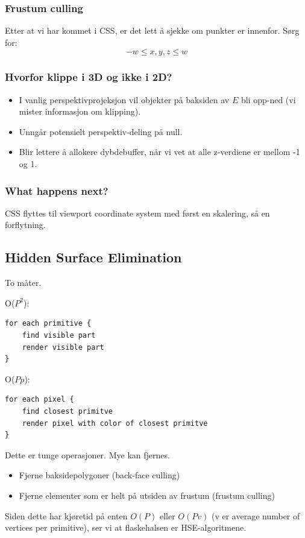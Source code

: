 \subsubsection{Frustum culling}
Etter at vi har kommet i CSS, er det lett å sjekke om punkter er innenfor. Sørg for:
\begin{equation} \label{eq:frustum_culling}
    -w \le x, y, z \le w
\end{equation}

\subsubsection{Hvorfor klippe i 3D og ikke i 2D?}
\begin{itemize}
    \item I vanlig perspektivprojeksjon vil objekter på baksiden av $E$ bli opp-ned (vi mister informasjon om klipping).
    \item Unngår potensielt perspektiv-deling på null.
    \item Blir lettere å allokere dybdebuffer, når vi vet at alle z-verdiene er mellom -1 og 1.
\end{itemize}

\subsubsection{What happens next?}
CSS flyttes til viewport coordinate system med først en skalering, så en forflytning.



\subsection{Hidden Surface Elimination}
To måter.

O($P^2$):
\begin{lstlisting}
for each primitive {
    find visible part
    render visible part
}
\end{lstlisting}

O($Pp$):
\begin{lstlisting}
for each pixel {
    find closest primitve
    render pixel with color of closest primitve
}
\end{lstlisting}
Dette er tunge operasjoner. Mye kan fjernes.
\begin{itemize}
    \item Fjerne baksidepolygoner (back-face culling)
    \item Fjerne elementer som er helt på utsiden av frustum (frustum culling)
\end{itemize}
Siden dette har kjøretid på enten $O(P)$ eller $O(Pv)$ (v er average number of vertices per primitive), ser vi at flaskehalsen er HSE-algoritmene.

